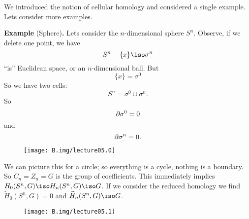 We introduced the notion of cellular homology and considered a
single example. Lets consider more examples.

\medbreak
{}
\noindent\textbf{Example \thethm\enspace}(Sphere)\textbf{.}\quad\ignorespaces %
Lets consider the $n$-dimensional sphere $S^n$. Observe, if we
delete one point, we have
\begin{equation}
S^n-\{x\}\iso\sigma^{n}
\end{equation}
``is'' Euclidean space, or an $n$-dimensional ball. But
\begin{equation}
\{x\}=\sigma^0
\end{equation}
So we have two cells:
\begin{equation}
S^{n}=\sigma^0\cup\sigma^n.
\end{equation}
So
\begin{equation}
\partial\sigma^0=0
\end{equation}
and
\begin{equation}
\partial\sigma^n=0.
\end{equation}

\begin{wrapfigure}{r}{4pc}
  \centering
  \texttt{[image: B.img/lecture05.0]}
\end{wrapfigure}
\noindent\ignorespaces %
We can picture this for a circle; so everything is a cycle,
nothing is a boundary. So $C_n=Z_n=G$ is the group of
coefficients. This immediately implies $H_0(S^n,G)\iso H_n(S^n,G)\iso G$.
If we consider the reduced homology we find $\widetilde{H}_{0}(S^n,G)=0$
and $\widetilde{H}_{n}(S^{n},G)\iso G$.
\medbreak

\begin{wrapfigure}{r}{14pc}
  \vspace{-12pt}
  \centering
  \texttt{[image: B.img/lecture05.1]}
  \vspace{-12pt}
\end{wrapfigure}

